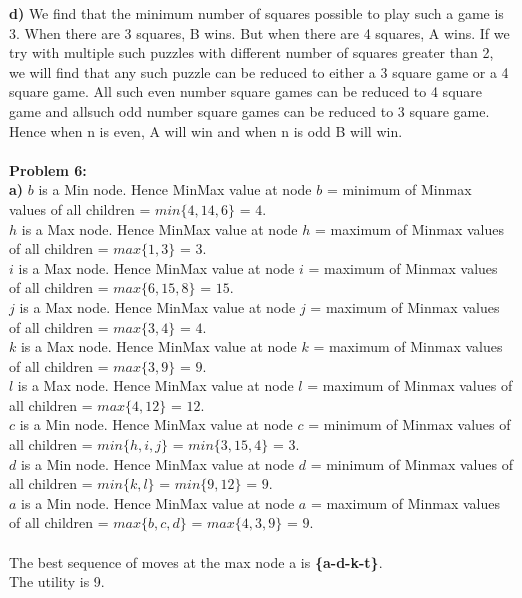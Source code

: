 {\bf d)} We find that the minimum number of squares possible to play such a game is 3. When there are 3 squares, B wins. But when there are 4 squares, A wins. If we try with multiple such puzzles with different number of squares greater than 2, we will find that any such puzzle can be reduced to either a 3 square game or a 4 square game. All such even number square games can be reduced to 4 square game and allsuch odd number square games can be reduced to 3 square game.\\ 
Hence when n is even, A will win and when n is odd B will win.\\ \\

{\bf Problem 6:}\\
{\bf a)}
$b$ is a Min node. Hence MinMax value at node $b$ = minimum of Minmax values of all children = $min\{4, 14, 6\}$ = $4$.\\
$h$ is a Max node. Hence MinMax value at node $h$ = maximum of Minmax values of all children = $max\{1, 3\}$ = $3$.\\
$i$ is a Max node. Hence MinMax value at node $i$ = maximum of Minmax values of all children = $max\{6, 15, 8\}$ = $15$.\\
$j$ is a Max node. Hence MinMax value at node $j$ = maximum of Minmax values of all children = $max\{3, 4\}$ = $4$.\\
$k$ is a Max node. Hence MinMax value at node $k$ = maximum of Minmax values of all children = $max\{3, 9\}$ = $9$.\\
$l$ is a Max node. Hence MinMax value at node $l$ = maximum of Minmax values of all children = $max\{4, 12\}$ = $12$.\\
$c$ is a Min node. Hence MinMax value at node $c$ = minimum of Minmax values of all children = $min\{h, i, j\}$ = $min\{3, 15, 4\}$ = $3$.\\
$d$ is a Min node. Hence MinMax value at node $d$ = minimum of Minmax values of all children = $min\{k, l\}$ = $min\{9, 12\}$ = $9$.\\
$a$ is a Min node. Hence MinMax value at node $a$ = maximum of Minmax values of all children = $max\{b, c, d\}$ = $max\{4, 3, 9\}$ = $9$.\\ \\

The best sequence of moves at the max node a is {\bf \{a-d-k-t\}}.\\
The utility is 9.\\ \\

